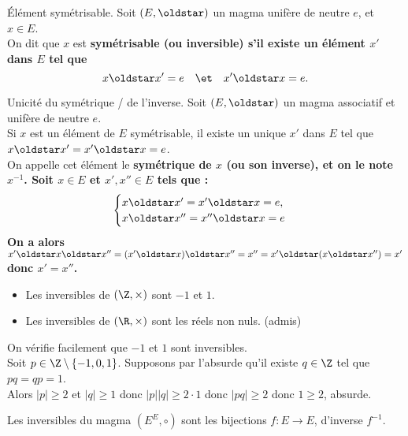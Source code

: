 \documentclass[11pt]{article}
\begin{document}
\begin{defi}{Élément symétrisable.}{}
    Soit $(E,\s)$ un magma unifère de neutre $e$, et $x\in E$.\\
    On dit que $x$ est \bf{symétrisable} (ou \bf{inversible}) s'il existe un élément $x'$ dans $E$ tel que
    \begin{equation*}
        x \s x' = e \quad\et\quad x'\s x=e.
    \end{equation*}
\end{defi}

\begin{prop}{Unicité du symétrique / de l'inverse.}{}
    Soit $(E,\s)$ un magma associatif et unifère de neutre $e$.\\
    Si $x$ est un élément de $E$ symétrisable, il existe un unique $x'$ dans $E$ tel que $x\s x'=x'\s x=e$.\\
    On appelle cet élément le \bf{symétrique} de $x$ (ou son inverse), et on le note $x^{-1}$. 
    \tcblower
    Soit $x\in E$ et $x',x''\in E$ tels que :
    \begin{equation*}
        \begin{cases}
            x \s x' = x' \s x = e,\\
            x \s x'' = x'' \s x = e
        \end{cases}
    \end{equation*}
    On a alors $x'\s x \s x'' = (x' \s x)\s x'' = x'' = x'\s(x\s x'') = x'$  donc $x'=x''$.
\end{prop}

\begin{ex}{}{}
    \begin{itemize}
        \item Les inversibles de $(\Z,\times)$ sont $-1$ et $1$.
        \item Les inversibles de $(\R,\times)$ sont les réels non nuls. (admis)
    \end{itemize}
    \tcblower
    On vérifie facilement que $-1$ et $1$ sont inversibles.\\
    Soit $p\in\Z\setminus\{-1,0,1\}$. Supposons par l'absurde qu'il existe $q\in\Z$ tel que $pq=qp=1$.\\
    Alors $|p|\geq2$ et $|q|\geq1$ donc $|p||q|\geq2\cdot 1$ donc $|pq|\geq 2$ donc $1\geq2$, absurde.
\end{ex}

\begin{ex}{}{}
    Les inversibles du magma $(E^E,\circ)$ sont les bijections $f:E\to E$, d'inverse $f^{-1}$.
\end{ex}
\end{document}
